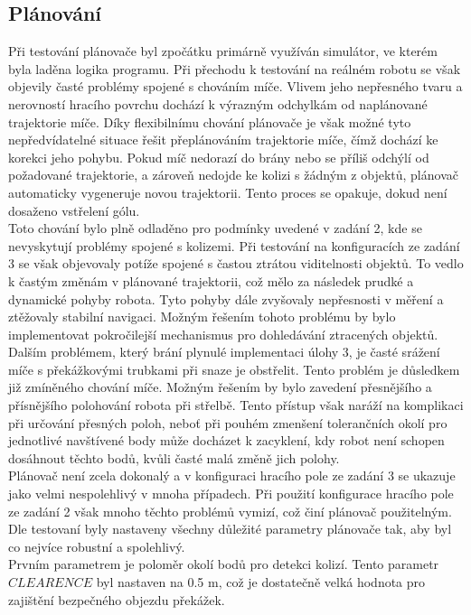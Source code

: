\documentclass[a4paper,12pt]{article}
\begin{document}
\subsection{Plánování}
Při testování plánovače byl zpočátku primárně využíván simulátor, ve kterém byla laděna logika programu. Při přechodu k testování na reálném robotu se však objevily časté problémy spojené s chováním míče. Vlivem jeho nepřesného tvaru a nerovností hracího povrchu dochází k výrazným odchylkám od naplánované trajektorie míče. Díky flexibilnímu chování plánovače je však možné tyto nepředvídatelné situace řešit přeplánováním trajektorie míče, čímž dochází ke korekci jeho pohybu. Pokud míč nedorazí do brány nebo se příliš odchýlí od požadované trajektorie, a zároveň nedojde ke kolizi s žádným z objektů, plánovač automaticky vygeneruje novou trajektorii. Tento proces se opakuje, dokud není dosaženo vstřelení gólu.\\
Toto chování bylo plně odladěno pro podmínky uvedené v zadání 2, kde se nevyskytují problémy spojené s kolizemi. Při testování na konfiguracích ze zadání 3 se však objevovaly potíže spojené s častou ztrátou viditelnosti objektů. To vedlo k častým změnám v plánované trajektorii, což mělo za následek prudké a dynamické pohyby robota. Tyto pohyby dále zvyšovaly nepřesnosti v měření a ztěžovaly stabilní navigaci. Možným řešením tohoto problému by bylo implementovat pokročilejší mechanismus pro dohledávání ztracených objektů.\\
Dalším problémem, který brání plynulé implementaci úlohy 3, je časté srážení míče s překážkovými trubkami při snaze je obstřelit. Tento problém je důsledkem již zmíněného chování míče. Možným řešením by bylo zavedení přesnějšího a přísnějšího polohování robota při střelbě. Tento přístup však naráží na komplikaci při určování přesných poloh, neboť při pouhém zmenšení tolerančních okolí pro jednotlivé navštívené body může docházet k zacyklení, kdy robot není schopen dosáhnout těchto bodů, kvůli časté malá změně jich polohy.\\
Plánovač není zcela dokonalý a v konfiguraci hracího pole ze zadání 3 se ukazuje jako velmi nespolehlivý v mnoha případech. Při použití konfigurace hracího pole ze zadání 2 však mnoho těchto problémů vymizí, což činí plánovač použitelným.
Dle testovaní byly nastaveny všechny důležité parametry plánovače tak, aby byl co nejvíce robustní a spolehlivý.\\
Prvním parametrem je poloměr okolí bodů pro detekci kolizí. Tento parametr $CLEARENCE$ byl nastaven na 0.5 m, což je dostatečně velká hodnota pro zajištění bezpečného objezdu překážek.\\
\end{document}
